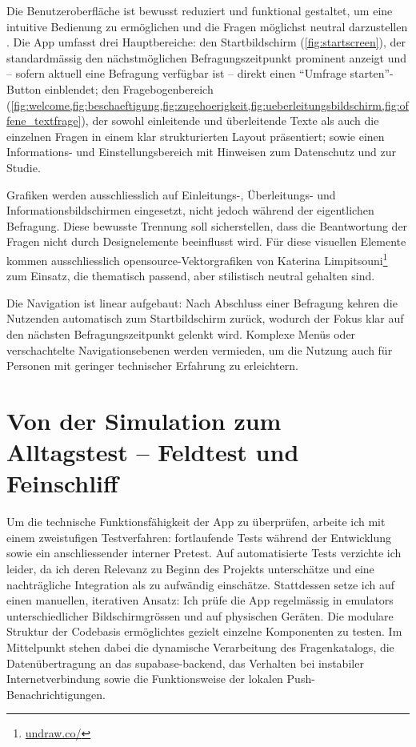Die Benutzeroberfläche ist bewusst reduziert und funktional gestaltet, um eine intuitive Bedienung zu ermöglichen und die Fragen möglichst neutral darzustellen \parencite{rogersInteractionDesignHumancomputer2023}. Die App umfasst drei Hauptbereiche: den Startbildschirm (\cref{fig:startscreen}), der standardmässig den nächstmöglichen Befragungszeitpunkt prominent anzeigt und -- sofern aktuell eine Befragung verfügbar ist -- direkt einen \enquote{Umfrage starten}-Button einblendet; den Fragebogenbereich (\cref{fig:welcome,fig:beschaeftigung,fig:zugehoerigkeit,fig:ueberleitungsbildschirm,fig:offene_textfrage}), der sowohl einleitende und überleitende Texte als auch die einzelnen Fragen in einem klar strukturierten Layout präsentiert; sowie einen Informations- und Einstellungsbereich mit Hinweisen zum Datenschutz und zur Studie.

Grafiken werden ausschliesslich auf Einleitungs-, Überleitungs- und Informationsbildschirmen eingesetzt, nicht jedoch während der eigentlichen Befragung. Diese bewusste Trennung soll sicherstellen, dass die Beantwortung der Fragen nicht durch Designelemente beeinflusst wird. Für diese visuellen Elemente kommen ausschliesslich \gls{opensource}-Vektorgrafiken von Katerina Limpitsouni\footnote{\href{https://undraw.co/}{undraw.co/}} zum Einsatz, die thematisch passend, aber stilistisch neutral gehalten sind.

Die Navigation ist linear aufgebaut: Nach Abschluss einer Befragung kehren die Nutzenden automatisch zum Startbildschirm zurück, wodurch der Fokus klar auf den nächsten Befragungszeitpunkt gelenkt wird. Komplexe Menüs oder verschachtelte Navigationsebenen werden vermieden, um die Nutzung auch für Personen mit geringer technischer Erfahrung zu erleichtern.

\section{Von der Simulation zum Alltagstest -- Feldtest und Feinschliff}
\label{sec:app_entwicklung_feldtest}

Um die technische Funktionsfähigkeit der App zu überprüfen, arbeite ich mit einem zweistufigen Testverfahren: fortlaufende Tests während der Entwicklung sowie ein anschliessender interner Pretest. Auf automatisierte Tests verzichte ich leider, da ich deren Relevanz zu Beginn des Projekts unterschätze und eine nachträgliche Integration als zu aufwändig einschätze. Stattdessen setze ich auf einen manuellen, iterativen Ansatz: Ich prüfe die App regelmässig in \glspl{emulator} unterschiedlicher Bildschirmgrössen und auf physischen Geräten. Die modulare Struktur der Codebasis ermöglichtes gezielt einzelne Komponenten zu testen. Im Mittelpunkt stehen dabei die dynamische Verarbeitung des Fragenkatalogs, die Datenübertragung an das \gls{supabase}-\gls{backend}, das Verhalten bei instabiler Internetverbindung sowie die Funktionsweise der lokalen Push-Benachrichtigungen.

